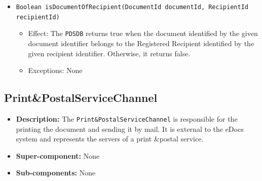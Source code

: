 \documentclass[a4paper,10pt]{article}
\begin{document}
\begin{itemize}
\begin{itemize}
		\item \texttt{Boolean isDocumentOfRecipient(DocumentId documentId, RecipientId recipientId)}
        \begin{itemize}
            \item Effect: The \texttt{PDSDB} returns true when the document identified by the given document identifier belongs to the Registered Recipient identified by the given recipient identifier. Otherwise, it returns false.
            \item Exceptions: None
		\end{itemize}         
         
    \end{itemize}
\end{itemize}

\subsection{Print\&PostalServiceChannel}
\begin{itemize}
    \item \textbf{Description:}  The \texttt{Print\&PostalServiceChannel} is responsible for the printing the document and sending it by mail. It is external to the eDocs system and represents the servers of a print \&postal service.
    \item \textbf{Super-component:} None
    \item \textbf{Sub-components:} None
\end{itemize}
\end{document}
